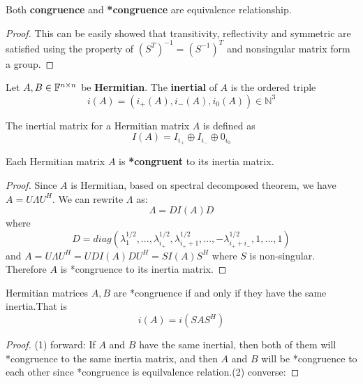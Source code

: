 \begin{refsection}
\begin{lemma}
Both \textbf{congruence} and \textbf{*congruence} are equivalence relationship.
\end{lemma}
\begin{proof}
This can be easily showed that transitivity, reflectivity and symmetric are satisfied using the property of $(S^T)^{-1} = (S^{-1})^T$ and nonsingular matrix form a group.
\end{proof}



\begin{definition}[inertia]\cite[280]{horn2012matrix}
Let $A,B\in \mathbb{F}^{n\times n}$ be \textbf{Hermitian}. The \textbf{inertial} of $A$ is the ordered triple
$$i(A) = (i_+(A),i_-(A),i_0(A))\in \mathbb{N}^3$$
\end{definition}

\begin{definition}\cite[282]{horn2012matrix}
The inertial matrix for a Hermitian matrix $A$ is defined as
$$I(A) = I_{i_+}\oplus I_{i_-} \oplus 0_{i_0}$$
\end{definition}


\begin{lemma}
Each Hermitian matrix $A$ is \textbf{*congruent} to its inertia matrix.
\end{lemma}
\begin{proof}
Since $A$ is Hermitian, based on spectral decomposed theorem, we have
$A = U\Lambda U^H$. 
We can rewrite $\Lambda$ as:
$$\Lambda = DI(A)D$$
where $$D=diag(\lambda_1^{1/2},...,\lambda_{i_+}^{1/2},\lambda_{i_+ + 1}^{1/2},...,-\lambda_{i_+ + i_-}^{1/2},1,...,1)$$
and 
$A = U\Lambda U^H = UDI(A)DU^H = SI(A)S^H$ where $S$ is non-singular. Therefore $A$ is *congruence to its inertia matrix.
\end{proof}


\begin{theorem}\cite[282]{horn2012matrix}\label{ch:linearalgebra:th:Sylvesterinertiatheorem}
Hermitian matrices $A,B$ are *congruence if and only if they have the same inertia.That is
$$i(A) = i(SAS^H)$$
\end{theorem}
\begin{proof}
(1) forward: If $A$ and $B$ have the same inertial, then both of them will *congruence to the same inertia matrix, and then $A$ and $B$ will be *congruence to each other since *congruence is equilvalence relation.(2) converse: 
\end{proof}


















\end{refsection}
